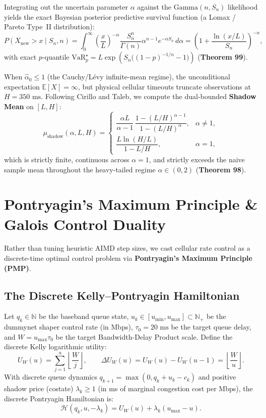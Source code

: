 \documentclass[11pt,a4paper]{article}
\theoremstyle{definition}
\begin{document}
Integrating out the uncertain parameter $\alpha$ against the $\mathrm{Gamma}(n, S_n)$ likelihood yields the exact Bayesian posterior predictive survival function (a Lomax / Pareto Type~II distribution):
\[
  P(X_{\mathrm{new}} > x \mid S_n, n) = \int_0^\infty \left(\frac{x}{L}\right)^{-\alpha} \frac{S_n^n}{\Gamma(n)} \alpha^{n-1} e^{-\alpha S_n}\,d\alpha = \left(1 + \frac{\ln(x/L)}{S_n}\right)^{-n},
\]
with exact $p$-quantile $\mathrm{VaR}_p^\star = L \exp\!\left(S_n \big((1-p)^{-1/n} - 1\big)\right)$ (\textbf{Theorem 99}).

When $\widehat{\alpha}_0 \le 1$ (the Cauchy/L\'evy infinite-mean regime), the unconditional expectation $\mathbb{E}[X] = \infty$, but physical cellular timeouts truncate observations at $H = 350\text{ ms}$. Following Cirillo and Taleb, we compute the dual-bounded \textbf{Shadow Mean} on $[L, H]$:
\[
  \mu_{\mathrm{shadow}}(\alpha, L, H) =
  \begin{cases}
    \dfrac{\alpha L}{\alpha - 1}\,\dfrac{1 - (L/H)^{\alpha - 1}}{1 - (L/H)^\alpha}, & \alpha \ne 1, \\[10pt]
    \dfrac{L \ln(H/L)}{1 - L/H}, & \alpha = 1,
  \end{cases}
\]
which is strictly finite, continuous across $\alpha = 1$, and strictly exceeds the naive sample mean throughout the heavy-tailed regime $\alpha \in (0, 2)$ (\textbf{Theorem 98}).

\section{Pontryagin's Maximum Principle \& Galois Control Duality}
\label{sec:pontryagin}

Rather than tuning heuristic AIMD step sizes, we cast cellular rate control as a discrete-time optimal control problem via \textbf{Pontryagin's Maximum Principle (PMP)}.

\subsection{The Discrete Kelly--Pontryagin Hamiltonian}

Let $q_k \in \mathbb{N}$ be the baseband queue state, $u_k \in [u_{\min}, u_{\max}] \subset \mathbb{N}_+$ be the dummynet shaper control rate (in Mbps), $\tau_0 = 20\text{ ms}$ be the target queue delay, and $W = u_{\max}\tau_0$ be the target Bandwidth-Delay Product scale. Define the discrete Kelly logarithmic utility:
\[
  U_W(u) = \sum_{j=1}^u \left\lfloor \frac{W}{j} \right\rfloor, \qquad \Delta U_W(u) = U_W(u) - U_W(u-1) = \left\lfloor \frac{W}{u} \right\rfloor.
\]
With discrete queue dynamics $q_{k+1} = \max(0, q_k + u_k - c_k)$ and positive shadow price (costate) $\lambda_k \ge 1$ (in ms of marginal congestion cost per Mbps), the discrete Pontryagin Hamiltonian is:
\[
  \mathcal{H}(q_k, u, -\lambda_k) = U_W(u) + \lambda_k (u_{\max} - u).
\]
\end{document}

